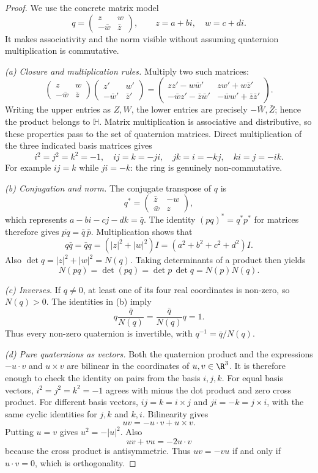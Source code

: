 \begin{proof}
We use the concrete matrix model
\[
q=\begin{pmatrix}z&w\\-\bar w&\bar z\end{pmatrix},
\qquad z=a+bi,\quad w=c+di.
\]
It makes associativity and the norm
visible without assuming quaternion
multiplication is commutative.

\emph{(a) Closure and multiplication rules.}
Multiply two such matrices:
\[
\begin{pmatrix}z&w\\-\bar w&\bar z\end{pmatrix}
\begin{pmatrix}z'&w'\\-\bar w'&\bar z'\end{pmatrix}
=
\begin{pmatrix}
zz'-w\bar w'&zw'+w\bar z'\\
-\bar wz'-\bar z\bar w'&
-\bar ww'+\bar z\bar z'
\end{pmatrix}.
\]
Writing the upper entries as $Z,W$,
the lower entries are precisely
$-\bar W,\bar Z$; hence the product
belongs to $\mathbb H$.
Matrix multiplication is associative
and distributive, so these properties
pass to the set of quaternion matrices.
Direct multiplication of the
three indicated basis matrices gives
\[
i^2=j^2=k^2=-1,\quad
ij=k=-ji,\quad jk=i=-kj,\quad
ki=j=-ik.
\]
For example $ij=k$ while $ji=-k$:
the ring is genuinely non-commutative.

\emph{(b) Conjugation and norm.}
The conjugate transpose of $q$ is
\[
q^*=\begin{pmatrix}
\bar z&-w\\\bar w&z
\end{pmatrix},
\]
which represents $a-bi-cj-dk=\bar q$.
The identity $(pq)^*=q^*p^*$
for matrices therefore gives
$\overline{pq}=\bar q\,\bar p$.
Multiplication shows that
\[
q\bar q=\bar qq=
(|z|^2+|w|^2)I
=(a^2+b^2+c^2+d^2)I.
\]
Also $\det q=|z|^2+|w|^2=N(q)$.
Taking determinants of a product
then yields
\[
N(pq)=\det(pq)=\det p\,\det q=N(p)N(q).
\]

\emph{(c) Inverses.}
If $q\ne0$, at least one of its
four real coordinates is non-zero,
so $N(q)>0$. The identities in
(b) imply
\[
q\frac{\bar q}{N(q)}
=\frac{\bar q}{N(q)}q=1.
\]
Thus every non-zero quaternion
is invertible, with
$\boxed{q^{-1}=\bar q/N(q)}$.

\emph{(d) Pure quaternions as vectors.}
Both the quaternion product and
the expressions $-u\cdot v$ and
$u\times v$ are bilinear in the
coordinates of $u,v\in\R^3$.
It is therefore enough to check
the identity on pairs from the
basis $i,j,k$.
For equal basis vectors,
$i^2=j^2=k^2=-1$ agrees with
minus the dot product and
zero cross product.
For different basis vectors,
$ij=k=i\times j$ and
$ji=-k=j\times i$, with the
same cyclic identities for
$j,k$ and $k,i$.
Bilinearity gives
\[
\boxed{uv=-u\cdot v+u\times v}.
\]
Putting $u=v$ gives $u^2=-|u|^2$.
Also
\[
uv+vu=-2u\cdot v
\]
because the cross product is
antisymmetric. Thus $uv=-vu$
if and only if $u\cdot v=0$,
which is orthogonality.
\end{proof}

